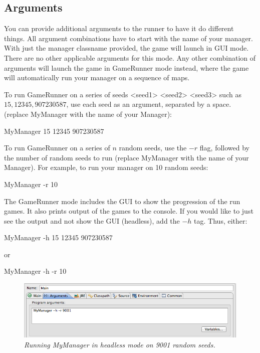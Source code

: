 \documentclass[11pt]{article}
\begin{document}
\subsection{Arguments}
You can provide additional arguments to the runner to have it do different things. All argument combinations have to start with the name of your manager. With just the manager classname provided, the game will launch in GUI mode. There are no other applicable arguments for this mode. Any other combination of arguments will launch the game in GameRunner mode instead, where the game will automatically run your manager on a sequence of maps. 

To run GameRunner on a series of seeds <seed1> <seed2> <seed3> such as $15, 12345, 907230587$, use each seed as an argument, separated by a space. (replace MyManager with the name of your Manager):
\begin{center}
MyManager 15 12345 907230587
\end{center}
To run GameRunner on a series of $n$ random seeds, use the $-r$ flag, followed by the number of random seeds to run (replace MyManager with the name of your Manager). For example, to run your manager on 10 random seeds:
\begin{center}
MyManager -r 10
\end{center}
The GameRunner mode includes the GUI to show the progression of the run games. It also prints output of the games to the console. If you would like to just see the output and not show the GUI (headless), add the $-h$ tag. Thus, either:
\begin{center}
MyManager -h 15 12345 907230587
\end{center}
or
\begin{center}
MyManager -h -r 10
\end{center}
\begin{figure}[h]
\centerline{\includegraphics[scale=0.65]{args.png}} 
\caption{\em{Running MyManager in headless mode on 9001 random seeds.}}
\end{figure}


\newpage
\end{document}
